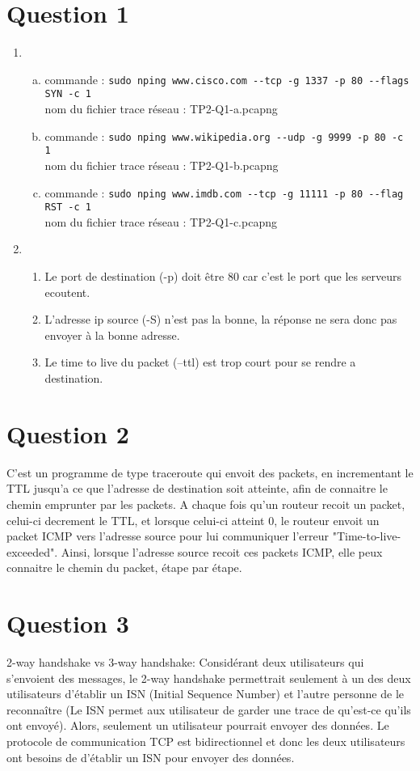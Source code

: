 
\section{Question 1}
\begin{enumerate}
	\item 
	\begin{enumerate}[a)]
		\item 
			commande : \verb!sudo nping www.cisco.com --tcp -g 1337 -p 80 --flags SYN -c 1!\\
			nom du fichier trace réseau : TP2-Q1-a.pcapng
		\item 
			commande : \verb!sudo nping www.wikipedia.org --udp -g 9999 -p 80 -c 1!\\
			nom du fichier trace réseau : TP2-Q1-b.pcapng
		\item 
			commande : \verb!sudo nping www.imdb.com --tcp -g 11111 -p 80 --flag RST -c 1!\\
			nom du fichier trace réseau : TP2-Q1-c.pcapng
	\end{enumerate}
	\item 
		\begin{enumerate}
			\item
				Le port de destination (-p) doit être 80 
				car c'est le port que les serveurs ecoutent.
			\item
				L'adresse ip source (-S) n'est pas la bonne,
				la réponse ne sera donc pas envoyer à la bonne
				adresse.
			\item
				Le time to live du packet (--ttl) est trop court
				pour se rendre a destination.
		\end{enumerate}
\end{enumerate}

\section{Question 2}
C'est un programme de type traceroute qui envoit des packets, 
en incrementant le TTL jusqu'a ce que l'adresse de destination soit 
atteinte, afin de connaitre le chemin emprunter par les packets. 
A chaque fois qu'un routeur recoit un packet, 
celui-ci decrement le TTL, et lorsque celui-ci atteint 0,
le routeur envoit un packet ICMP vers l'adresse source pour lui
communiquer l'erreur "Time-to-live-exceeded". Ainsi, lorsque 
l'adresse source recoit ces packets ICMP, 
elle peux connaitre le chemin du packet, étape par étape.

\section{Question 3}
2-way handshake vs 3-way handshake:
Considérant deux utilisateurs qui s’envoient des messages, le 2-way handshake permettrait seulement à un des deux utilisateurs d’établir un ISN (Initial Sequence Number) et l’autre personne de le reconnaître (Le ISN permet aux utilisateur de garder une trace de qu’est-ce qu’ils ont envoyé). Alors, seulement un utilisateur pourrait envoyer des données. Le protocole de communication TCP est bidirectionnel et donc les deux utilisateurs ont besoins de d’établir un ISN pour envoyer des données.

